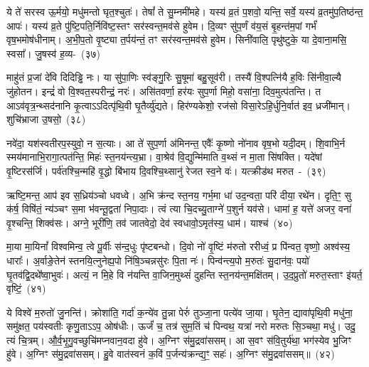 ये ते॑ सरस्व ऊ॒र्मयो॒ मधु॑मन्तो घृत॒श्चुतः॑। तेषां᳚ ते सु॒म्नमी॑महे। यस्य॑ व्र॒तं प॒शवो॒ यन्ति॒ सर्वे॒ यस्य॑ व्र॒तमु॑प॒तिष्ठ॑न्त॒ आपः॑। यस्य॑ व्र॒ते पु॑ष्टि॒पति॒र्निवि॑ष्ट॒स्तꣳ सर॑स्वन्त॒मव॑से हुवेम। दि॒व्यꣳ सु॑प॒र्णं व॑य॒सं बृ॒हन्त॑म॒पां गर्भं॑ वृष॒भमोष॑धीनाम्। अ॒भी॒प॒तो वृ॒ष्ट्या त॒र्पय॑न्तं॒ तꣳ सर॑स्वन्त॒मव॑से हुवेम। सिनी॑वालि॒ पृथु॑ष्टुके॒ या दे॒वाना॒मसि॒ स्वसा᳚। जु॒षस्व॑ ह॒व्य-~(३७)

माहु॑तं प्र॒जां दे॑वि दिदिड्ढि नः। या सु॑पा॒णिः स्व॑ङ्गु॒रिः सु॒षूमा॑ बहु॒सूव॑री। तस्यै॑ वि॒श्पत्नि॑यै ह॒विः सि॑नीवा॒ल्यै जु॑होतन। इन्द्रं॑ वो वि॒श्वत॒स्परीन्द्रं॒ नरः॑। असि॑तवर्णा॒ हर॑यः सुप॒र्णा मिहो॒ वसा॑ना॒ दिव॒मुत्प॑तन्ति। त आ\-ऽव॑वृत्र॒न्थ्सद॑नानि कृ॒त्वा\-ऽऽ\-दित्पृ॑थि॒वी घृ॒तैर्व्यु॑द्यते। हिर॑ण्यकेशो॒ रज॑सो विसा॒रे\-ऽहि॒र्धुनि॒र्वात॑ इव॒ ध्रजी॑\-मान्। शुचि॑भ्राजा उ॒षसो॒~(३८)

नवे॑दा॒ यश॑स्वतीरप॒स्युवो॒ न स॒त्याः। आ ते॑ सुप॒र्णा अ॑मिनन्त॒ एवैः᳚ कृ॒ष्णो नो॑नाव वृष॒भो यदी॒दम्। शि॒वाभि॒र्न स्मय॑\-माना\-भि॒रागा॒त्पत॑न्ति॒ मिहः॑ स्त॒नय॑न्त्य॒भ्रा। वा॒श्रेव॑ वि॒द्युन्मि॑माति व॒थ्सं न मा॒ता सि॑षक्ति। यदे॑षां वृ॒ष्टिरस॑र्जि। पर्व॑तश्चि॒न्महि॑ वृ॒द्धो बि॑भाय दि॒वश्चि॒थ्सानु॑ रेजत स्व॒ने वः॑। यत्क्रीड॑थ मरुत~-~(३९)

ऋष्टि॒मन्त॒ आप॑ इव स॒ध्रिय॑ञ्चो धवध्वे। अ॒भि क्र॑न्द स्त॒नय॒ गर्भ॒मा धा॑ उद॒न्वता॒ परि॑ दीया॒ रथे॑न। दृति॒ꣳ॒ सु क॑र्\mbox{}ष॒ विषि॑तं॒ न्य॑ञ्चꣳ स॒मा भ॑वन्तू॒द्वता॑ निपा॒दाः। त्वं त्या चि॒दच्यु॒ताग्ने॑ प॒शुर्न यव॑से। धामा॑ ह॒ यत्ते॑ अजर॒ वना॑ वृ॒श्चन्ति॒ शिक्व॑सः। अग्ने॒ भूरी॑णि॒ तव॑ जातवेदो॒ देव॑ स्वधावो॒\-ऽमृत॑स्य॒ धाम॑। याश्च॑~(४०)

मा॒या मा॒यिनां᳚ विश्वमिन्व॒ त्वे पू॒र्वीः स॑न्द॒धुः पृ॑ष्टबन्धो। दि॒वो नो॑ वृ॒ष्टिं म॑रुतो ररीध्वं॒ प्र पि॑न्वत॒ वृष्णो॒ अश्व॑स्य॒ धाराः᳚। अ॒र्वाङे॒तेन॑ स्तनयि॒त्नुनेह्य॒पो नि॑षि॒ञ्चन्नसु॑रः पि॒ता नः॑। पिन्व॑न्त्य॒पो म॒रुतः॑ सु॒\-दान॑वः॒ पयो॑ घृ॒तव॑द्वि॒दथे᳚ष्वा॒भुवः॑। अत्यं॒ न मि॒हे वि न॑यन्ति वा॒जिन॒\-मुथ्सं॑ दुहन्ति स्त॒नय॑न्त॒मक्षि॑तम्। उ॒द॒प्रुतो॑ मरुत॒स्ताꣳ इ॑यर्त॒ वृष्टिं॒~(४१)

ये विश्वे॑ म॒रुतो॑ जु॒नन्ति॑। क्रोशा॑ति॒ गर्दा॑ क॒न्ये॑व तु॒न्ना पेरुं॑ तुञ्जा॒ना पत्ये॑व जा॒या। घृ॒तेन॒ द्यावा॑\-पृथि॒वी मधु॑ना॒ समु॑क्षत॒ पय॑स्वतीः कृणु॒ता\-ऽऽ\-प॒ ओष॑धीः। ऊर्जं॑ च॒ तत्र॑ सुम॒तिं च॑ पिन्वथ॒ यत्रा॑ नरो मरुतः सि॒ञ्चथा॒ मधु॑। उदु॒ त्यं चि॒त्रम्। औ॒र्व॒भृ॒गु॒वच्छुचि॑मप्नवान॒वदा हु॑वे। अ॒ग्निꣳ स॑मु॒द्रवा॑ससम्। आ स॒वꣳ स॑वि॒तुर्य॑था॒ भग॑स्येव भु॒जिꣳ हु॑वे। अ॒ग्निꣳ स॑मु॒द्रवा॑ससम्। हु॒वे वात॑स्वनं क॒विं प॒र्जन्य॑क्रन्द्य॒ꣳ॒ सहः॑। अ॒ग्निꣳ स॑मु॒द्रवा॑ससम्॥~(४२)

